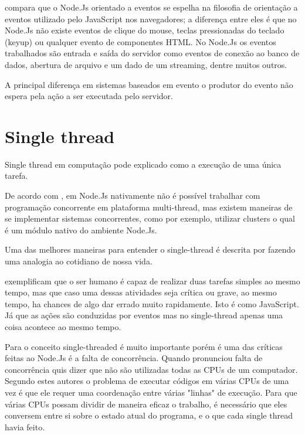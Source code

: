    compara que o Node.Js orientado a eventos se espelha na filosofia de orientação 
  a eventos utilizado pelo JavaScript nos navegadores; a diferença entre eles é que no Node.Js 
  não existe eventos de clique do mouse, teclas pressionadas do teclado (keyup) ou qualquer evento de componentes HTML.
  No Node.Js os eventos trabalhados são entrada e saída do servidor como eventos de conexão 
  ao banco de dados, abertura de arquivo e um dado de um streaming, dentre muitos outros.
  
  A principal diferença em sistemas baseados em evento o produtor do evento não espera pela ação a ser executada
  pelo servidor. \cite{Junior:2012}   


\section{Single thread}
\label{single-thread}

  Single thread em computação pode explicado como a execução de uma única tarefa.
  
  De acordo com , em Node.Js nativamente não é possível trabalhar com programação 
  concorrente em plataforma multi-thread, mas existem maneiras de se implementar sistemas concorrentes, 
  como por exemplo, utilizar clusters o qual é um módulo nativo do ambiente Node.Js.
  
  Uma das melhores maneiras para entender o single-thread é descrita por 
  fazendo uma analogia ao cotidiano de nossa vida.
  
   exemplificam que o ser humano é capaz de realizar duas tarefas simples ao mesmo tempo,
  mas que caso uma dessas atividades seja crítica ou grave, ao mesmo tempo, ha chances de algo dar errado muito rapidamente. 
  Isto é como JavaScript. Já que as ações são conduzidas por eventos mas no single-thread apenas uma coisa 
  acontece ao mesmo tempo.
  
  Para  o conceito single-threaded é muito importante porém é uma das críticas 
  feitas ao Node.Js é a falta de concorrência. Quando  pronunciou falta de concorrência 
  quis dizer que não são utilizadas todas as CPUs de um computador. 
  Segundo estes autores o problema de executar códigos em várias CPUs de uma vez é que ele requer 
  uma coordenação entre várias "linhas" de execução. Para que várias CPUs possam dividir de maneira eficaz o trabalho, 
  é necessário que eles conversem entre si sobre o estado atual do programa, e o que cada single thread havia feito.
  
